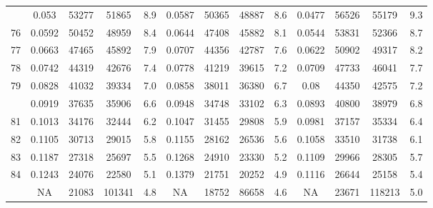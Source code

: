 \documentclass[
  14pt,
]{article}
\begin{document}
\begin{longtable}[t]{lcccccccccccc}
\addlinespace
75 & 0.053 & 53277 & 51865 & 8.9 & 0.0587 & 50365 & 48887 & 8.6 & 0.0477 & 56526 & 55179 & 9.3\\
76 & 0.0592 & 50452 & 48959 & 8.4 & 0.0644 & 47408 & 45882 & 8.1 & 0.0544 & 53831 & 52366 & 8.7\\
77 & 0.0663 & 47465 & 45892 & 7.9 & 0.0707 & 44356 & 42787 & 7.6 & 0.0622 & 50902 & 49317 & 8.2\\
78 & 0.0742 & 44319 & 42676 & 7.4 & 0.0778 & 41219 & 39615 & 7.2 & 0.0709 & 47733 & 46041 & 7.7\\
79 & 0.0828 & 41032 & 39334 & 7.0 & 0.0858 & 38011 & 36380 & 6.7 & 0.08 & 44350 & 42575 & 7.2\\
\addlinespace
80 & 0.0919 & 37635 & 35906 & 6.6 & 0.0948 & 34748 & 33102 & 6.3 & 0.0893 & 40800 & 38979 & 6.8\\
81 & 0.1013 & 34176 & 32444 & 6.2 & 0.1047 & 31455 & 29808 & 5.9 & 0.0981 & 37157 & 35334 & 6.4\\
82 & 0.1105 & 30713 & 29015 & 5.8 & 0.1155 & 28162 & 26536 & 5.6 & 0.1058 & 33510 & 31738 & 6.1\\
83 & 0.1187 & 27318 & 25697 & 5.5 & 0.1268 & 24910 & 23330 & 5.2 & 0.1109 & 29966 & 28305 & 5.7\\
84 & 0.1243 & 24076 & 22580 & 5.1 & 0.1379 & 21751 & 20252 & 4.9 & 0.1116 & 26644 & 25158 & 5.4\\
\addlinespace
85 & NA & 21083 & 101341 & 4.8 & NA & 18752 & 86658 & 4.6 & NA & 23671 & 118213 & 5.0\\*
\end{longtable}
\end{document}
